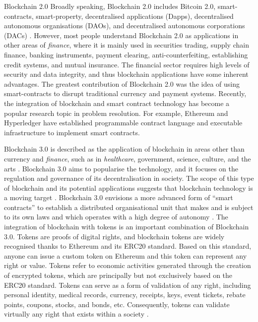 Blockchain 2.0
Broadly speaking, Blockchain 2.0 includes Bitcoin 2.0, smart-contracts, smart-property, decentralised applications (Dapps), decentralised autonomous organisations (DAOs), and decentralised autonomous corporations (DACs) \cite{swan2015blockchain}. However, most people understand Blockchain 2.0 as applications in other areas of \textit{finance}, where it is mainly used in securities trading, supply chain finance, banking instruments, payment clearing, anti-counterfeiting, establishing credit systems, and mutual insurance. The financial sector requires high levels of security and data integrity, and thus blockchain applications have some inherent advantages. The greatest contribution of Blockchain 2.0 was the idea of using smart-contracts to disrupt traditional currency and payment systems. Recently, the integration of blockchain and smart contract technology has become a popular research topic in problem resolution. For example, Ethereum and Hyperledger have established programmable contract language and executable infrastructure to implement smart contracts. \newline

Blockchain 3.0 is described as the application of blockchain in areas other than currency and \textit{finance}, such as in \textit{healthcare}, government, science, culture, and the arts \cite{swan2015blockchain}. Blockchain 3.0 aims to popularise the technology, and it focuses on the regulation and governance of its decentralisation in society. The scope of this type of blockchain and its potential applications suggests that blockchain technology is a moving target \cite{crosby2016blockchain}. Blockchain 3.0 envisions a more advanced form of “smart contracts” to establish a distributed organisational unit that makes and is subject to its own laws and which operates with a high degree of autonomy \cite{pieroni2018smarter}. The integration of blockchain with tokens is an important combination of Blockchain 3.0. Tokens are proofs of digital rights, and blockchain tokens are widely recognised thanks to Ethereum and its ERC20 standard. Based on this standard, anyone can issue a custom token on Ethereum and this token can represent any right or value. Tokens refer to economic activities generated through the creation of encrypted tokens, which are principally but not exclusively based on the ERC20 standard. Tokens can serve as a form of validation of any right, including personal identity, medical records, currency, receipts, keys, event tickets, rebate points, coupons, stocks, and bonds, etc. Consequently, tokens can validate virtually any right that exists within a society \cite{xu2019systematic}.

